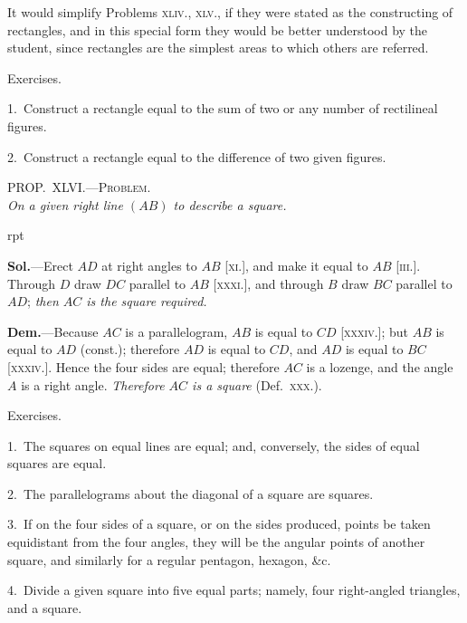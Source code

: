 \documentclass[oneside]{book}
\newcommand\myprop[2]{
\bigskip\Needspace*{4\baselineskip}\begin{center}\textsc{#1}\\\medskip\emph{#2}\par\end{center}
}
\newcommand\exhead[1]{
\Needspace*{5\baselineskip}\begin{center}
\textsf{#1}
\end{center}
}
\newcommand\imgflow[3]{
\setcounter{wrapwidth}{#1}
\begin{wrapfigure}[#2]{r}{\value{wrapwidth}pt}
\begin{center}
\vspace{-0.3in}
\end{center}
\end{wrapfigure}
}
\begin{document}
\begin{footnotesize}
It would simplify Problems \textsc{xliv}., \textsc{xlv}., if they were stated as
the constructing of rectangles, and in this special form they
would be better understood by the student, since rectangles are
the simplest areas to which others are referred.
\par\end{footnotesize}


\exhead{Exercises.}

\begin{footnotesize}
1.~Construct a rectangle equal to the sum of two or any
number of rectilineal figures.

2.~Construct a rectangle equal to the difference of two given
figures.
\par\end{footnotesize}


\myprop{PROP\@.~XLVI\@.---Problem.}{On a given right line $(AB)$ to describe a square.}

\imgflow{90}{9}{f255}

\textbf{Sol.}---Erect $AD$ at right angles to $AB$ [\textsc{xi}.], and
make it equal to $AB$ [\textsc{iii}.]. Through
$D$ draw $DC$ parallel to $AB$ [\textsc{xxxi}.],
and through $B$ draw $BC$ parallel to
$AD$; \emph{then $AC$ is the square required.}

\textbf{Dem.}---Because $AC$ is a parallelogram,
$AB$ is equal to $CD$ [\textsc{xxxiv}.];
but $AB$ is equal to $AD$ (const.); therefore
$AD$ is equal to $CD$, and $AD$ is
equal to $BC$ [\textsc{xxxiv}.]. Hence the four sides are equal;
therefore $AC$ is a lozenge, and the angle $A$ is a right
angle. \emph{Therefore $AC$ is a square} (Def.~\textsc{xxx}.).



\exhead{Exercises.}

\begin{footnotesize}
1.~The squares on equal lines are equal; and, conversely, the
sides of equal squares are equal.

2.~The parallelograms about the diagonal of a square are
squares.

3.~If on the four sides of a square, or on the sides produced,
points be taken equidistant from the four angles, they will be the
angular points of another square, and similarly for a regular
pentagon, hexagon, \&c.

4.~Divide a given square into five equal parts; namely, four
right-angled triangles, and a square.
\par\end{footnotesize}
\end{document}
